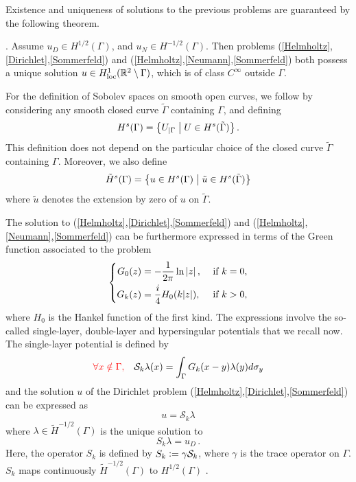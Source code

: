 \documentclass[a4paper]{article}
\begin{document}
\noindent Existence and uniqueness of solutions to the previous problems are guaranteed by the following theorem.
\begin{theorem}
\cite{stephan1984augmented,wendland1990hypersingular,monch1996numerical}. Assume $u_D \in H^{1/2}(\Gamma)$, and $u_N \in H^{-1/2}(\Gamma)$. 
Then problems (\ref{Helmholtz},\ref{Dirichlet},\ref{Sommerfeld}) and (\ref{Helmholtz},\ref{Neumann},\ref{Sommerfeld}) both possess a unique solution 
$u \in H^1_\textup{loc}(\mathbb{R}^2 \setminus \Gamma)$, which is of class $C^{\infty}$ outside $\Gamma$. \end{theorem}
\noindent For the definition of Sobolev spaces on smooth open curves, we follow
\cite{mclean2000strongly} by considering any smooth closed curve $\tilde{\Gamma}$ containing $\Gamma$, and defining 
\[H^s(\Gamma) = \left\{U_{|\Gamma}\mathrel{}\middle|\mathrel{} U \in H^s(\tilde{\Gamma}) \right\}.\]
This definition does not depend on the particular choice of the closed curve $\tilde{\Gamma}$ containing $\Gamma$. Moreover, we also define
\[\tilde{H}^s(\Gamma) = \left\{u \in H^s(\Gamma)\mathrel{}\middle|\mathrel{}\tilde{u} \in H^s(\tilde{\Gamma})\right\}\]
where $\tilde{u}$ denotes the extension by zero of $u$ on $\tilde{\Gamma}$.

The solution to (\ref{Helmholtz},\ref{Dirichlet},\ref{Sommerfeld}) and (\ref{Helmholtz},\ref{Neumann},\ref{Sommerfeld}) can be furthermore expressed in 
terms of the Green function associated to the problem
\begin{equation}
	\left\{
	\begin{aligned}
		G_0(z) &= -\dfrac{1}{2\pi} \ln \left\lvert z \right\rvert, && \text{ if } k= 0,\\
		G_k(z) &= \frac{i}{4}H_0(k|z|), && \text{ if } k > 0,
	\end{aligned} 
	\right.
\end{equation} 
where $H_0$ is the Hankel function of the first kind. The expressions involve the so-called single-layer, double-layer and hypersingular potentials that we 
recall now. The single-layer potential is defined by
\begin{equation}
	{\color{red}\forall x \notin \Gamma,}  \quad \mathcal{S}_k\lambda(x) = \int_{\Gamma}G_k(x-y)\lambda(y)d\sigma_y
	\label{defSk}
\end{equation}
and the solution $u$ of the Dirichlet problem (\ref{Helmholtz},\ref{Dirichlet},\ref{Sommerfeld}) can be expressed 
as
\begin{equation}
	u = \mathcal{S}_k \lambda
\end{equation}
where $\lambda \in \tilde{H}^{-1/2}(\Gamma)$ is the unique solution to 
\begin{equation}
	S_k \lambda = u_D\,.
	\label{Sklambda}
\end{equation}
Here, the operator $S_k$ is defined by $S_k \mathrel{\mathop:}= \gamma \mathcal{S}_k$, where $\gamma$ is the trace operator on $\Gamma$. $S_k$ maps continuously 
$\tilde{H}^{-1/2}(\Gamma)$ to $H^{1/2}(\Gamma)$ \cite[Theorem 1.8]{wendland1990hypersingular}. 
\end{document}
